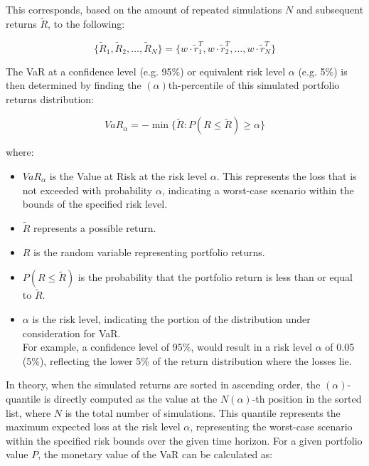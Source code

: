 \documentclass{article}
\begin{document}
\vspace{0.3cm}
This corresponds, based on the amount of repeated simulations \(N\) and subsequent returns \(\tilde{R}\), to the following:

\begin{equation}
    \{\tilde{R}_1, \tilde{R}_2, \ldots, \tilde{R}_N\} = \{w \cdot \tilde{r}_1^T, w \cdot \tilde{r}_2^T, \ldots, w \cdot \tilde{r}_N^T\}
\end{equation}

\vspace{0.3cm}
The VaR at a confidence level (e.g. 95\%) or equivalent risk level \(\alpha\) (e.g. 5\%) is then determined by finding the \((\alpha)\)th-percentile of this simulated portfolio returns distribution:

\begin{equation}
  VaR_\alpha = -\min \{\tilde{R} : P(R \leq \tilde{R}) \geq \alpha\}
\end{equation}

where:
\begin{itemize}
  \item \(VaR_\alpha\) is the Value at Risk at the risk level \(\alpha\). This represents the loss that is not exceeded with probability \(\alpha\), indicating a worst-case scenario within the bounds of the specified risk level.
  \item \(\tilde{R}\) represents a possible return.
  \item \(R\) is the random variable representing portfolio returns.
  \item \(P(R \leq \tilde{R})\) is the probability that the portfolio return is less than or equal to \(\tilde{R}\).
  \item \(\alpha\) is the risk level, indicating the portion of the distribution under consideration for VaR. \\For example, a confidence level of 95\%, would result in a risk level \(\alpha\) of 0.05 (5\%), reflecting the lower 5\% of the return distribution where the losses lie.
\end{itemize}

In theory, when the simulated returns are sorted in ascending order, the \((\alpha)\)-quantile is directly computed as the value at the \(N(\alpha)\)-th position in the sorted list, where \(N\) is the total number of simulations. This quantile represents the maximum expected loss at the risk level \(\alpha\), representing the worst-case scenario within the specified risk bounds over the given time horizon. For a given portfolio value \(P\), the monetary value of the VaR can be calculated as:
\end{document}
